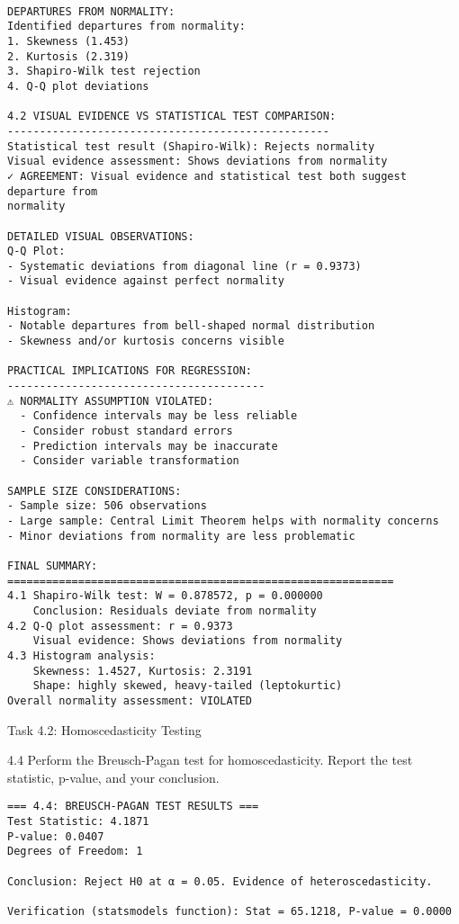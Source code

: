 \documentclass[11pt, twocolumn]{article}
\begin{document}
    \begin{Verbatim}[commandchars=\\\{\}]

DEPARTURES FROM NORMALITY:
Identified departures from normality:
1. Skewness (1.453)
2. Kurtosis (2.319)
3. Shapiro-Wilk test rejection
4. Q-Q plot deviations

4.2 VISUAL EVIDENCE VS STATISTICAL TEST COMPARISON:
--------------------------------------------------
Statistical test result (Shapiro-Wilk): Rejects normality
Visual evidence assessment: Shows deviations from normality
✓ AGREEMENT: Visual evidence and statistical test both suggest departure from
normality

DETAILED VISUAL OBSERVATIONS:
Q-Q Plot:
- Systematic deviations from diagonal line (r = 0.9373)
- Visual evidence against perfect normality

Histogram:
- Notable departures from bell-shaped normal distribution
- Skewness and/or kurtosis concerns visible

PRACTICAL IMPLICATIONS FOR REGRESSION:
----------------------------------------
⚠ NORMALITY ASSUMPTION VIOLATED:
  - Confidence intervals may be less reliable
  - Consider robust standard errors
  - Prediction intervals may be inaccurate
  - Consider variable transformation

SAMPLE SIZE CONSIDERATIONS:
- Sample size: 506 observations
- Large sample: Central Limit Theorem helps with normality concerns
- Minor deviations from normality are less problematic

FINAL SUMMARY:
============================================================
4.1 Shapiro-Wilk test: W = 0.878572, p = 0.000000
    Conclusion: Residuals deviate from normality
4.2 Q-Q plot assessment: r = 0.9373
    Visual evidence: Shows deviations from normality
4.3 Histogram analysis:
    Skewness: 1.4527, Kurtosis: 2.3191
    Shape: highly skewed, heavy-tailed (leptokurtic)
Overall normality assessment: VIOLATED
    \end{Verbatim}

    Task 4.2: Homoscedasticity Testing

    4.4 Perform the Breusch-Pagan test for homoscedasticity. Report the test
statistic, p-value, and your conclusion.

    \begin{Verbatim}[commandchars=\\\{\}]
=== 4.4: BREUSCH-PAGAN TEST RESULTS ===
Test Statistic: 4.1871
P-value: 0.0407
Degrees of Freedom: 1

Conclusion: Reject H0 at α = 0.05. Evidence of heteroscedasticity.

Verification (statsmodels function): Stat = 65.1218, P-value = 0.0000


    \end{Verbatim}
\end{document}
